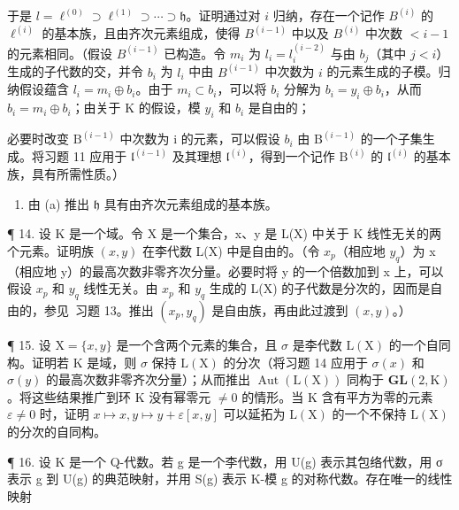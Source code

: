 于是 \(l = \ell^{(0)} \supset \ell^{(1)} \supset \cdots \supset \mathfrak{h}\)。证明通过对 \(i\) 归纳，存在一个记作 \(B^{(i)}\) 的 \(\ell^{(i)}\) 的基本族，且由齐次元素组成，使得 \(B^{(i-1)}\) 中以及 \(B^{(i)}\) 中次数 \(< i - 1\) 的元素相同。（假设 \(B^{(i-1)}\) 已构造。令 \(m_i\) 为 \(l_i = l_i^{(i-2)}\) 与由 \(b_j\)（其中 \(j < i\)）生成的子代数的交，并令 \(b_i\) 为 \(l_i\) 中由 \(B^{(i-1)}\) 中次数为 \(i\) 的元素生成的子模。归纳假设蕴含 \(l_i = m_i \oplus b_i\)。由于 \(m_i \subset b_i\)，可以将 \(b_i\) 分解为 \(b_i = y_i \oplus b_i\)，从而 \(b_i = m_i \oplus b_i\)；由关于 K 的假设，模 \(y_i\) 和 \(b_i\) 是自由的；

必要时改变 \(\mathrm{B}^{(i-1)}\) 中次数为 i 的元素，可以假设 \(b_{i}\) 由 \(\mathrm{B}^{(i-1)}\) 的一个子集生成。将习题 11 应用于 \(\mathfrak{l}^{(i-1)}\) 及其理想 \(\mathfrak{l}^{(i)}\)，得到一个记作 \(\mathrm{B}^{(i)}\) 的 \(\mathfrak{l}^{(i)}\) 的基本族，具有所需性质。）

\begin{enumerate}
\def\labelenumi{(\alph{enumi})}
\setcounter{enumi}{1}
\tightlist
\item
  由 (a) 推出 \(\mathfrak{h}\) 具有由齐次元素组成的基本族。
\end{enumerate}

¶ 14. 设 K 是一个域。令 X 是一个集合，x、y 是 L(X) 中关于 K 线性无关的两个元素。证明族 \((x,y)\) 在李代数 L(X) 中是自由的。（令 \(x_{p}\)（相应地 \(y_{q}\)）为 x（相应地 y）的最高次数非零齐次分量。必要时将 y 的一个倍数加到 x 上，可以假设 \(x_{p}\) 和 \(y_{q}\) 线性无关。由 \(x_{p}\) 和 \(y_{q}\) 生成的 L(X) 的子代数是分次的，因而是自由的，参见~习题 13。推出 \((x_{p},y_{q})\) 是自由族，再由此过渡到 \((x,y)\)。）

¶ 15. 设 \(\mathrm{X} = \{x, y\}\) 是一个含两个元素的集合，且 \(\sigma\) 是李代数 \(\mathrm{L}(\mathrm{X})\) 的一个自同构。证明若 \(\mathrm{K}\) 是域，则 \(\sigma\) 保持 \(\mathrm{L}(\mathrm{X})\) 的分次（将习题 14 应用于 \(\sigma(x)\) 和 \(\sigma(y)\) 的最高次数非零齐次分量）；从而推出 \(\operatorname{Aut}(\mathrm{L}(\mathrm{X}))\) 同构于 \(\mathbf{GL}(2, \mathrm{K})\)。将这些结果推广到环 \(\mathrm{K}\) 没有幂零元 \(\neq 0\) 的情形。当 \(\mathrm{K}\) 含有平方为零的元素 \(\varepsilon \neq 0\) 时，证明 \(x \mapsto x, y \mapsto y + \varepsilon[x, y]\) 可以延拓为 \(\mathrm{L}(\mathrm{X})\) 的一个不保持 \(\mathrm{L}(\mathrm{X})\) 的分次的自同构。

¶ 16. 设 K 是一个 Q-代数。若 g 是一个李代数，用 U(g) 表示其包络代数，用 σ 表示 g 到 U(g) 的典范映射，并用 S(g) 表示 K-模 g 的对称代数。存在唯一的线性映射

